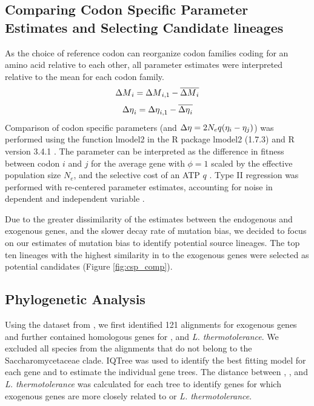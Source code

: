 \documentclass[fleqn,letterpaper]{article}
\begin{document}
\subsection*{Comparing Codon Specific Parameter Estimates and Selecting Candidate lineages}
As the choice of reference codon can reorganize codon families coding for an amino acid relative to each other, all parameter estimates were interpreted relative to the mean for each codon family.
\begin{equation}
{\Delta M}_i = {\Delta M}_{i,1} - \overline{{\Delta M}_i}
\end{equation}
\begin{equation}
{\Delta \eta}_i = {\Delta \eta}_{i,1} - \overline{{\Delta \eta}_i}
\end{equation}
Comparison of codon specific parameters (\DM and ${\Delta \eta} = 2N_eq(\eta_i-\eta_j)$) was performed using the function lmodel2 in the R package lmodel2 (1.7.3) \citep{lmodel2} and R version 3.4.1 \citep{rcore}.
The parameter \DE can be interpreted as the difference in fitness between codon $i$ and $j$ for the average gene with $\phi = 1$ scaled by the  effective population size $N_e$, and the selective cost of an ATP $q$ \citep{gilchrist2007, gilchrist2015}.
Type II regression was performed with re-centered parameter estimates, accounting for noise in dependent and independent variable \citep{SokalAndRohlf1981}.

Due to the greater dissimilarity of the \DM estimates between the endogenous and exogenous genes, and the slower decay rate of mutation bias, we decided to focus on our estimates of mutation bias to identify potential source lineages.
The top ten lineages with the highest similarity in \DM to the exogenous genes were selected as potential candidates (Figure \ref{fig:csp_comp}).

\subsection*{Phylogenetic Analysis}
Using the dataset from \citet{shen2018}, we first identified 121 alignments for exogenous genes and further contained homologous genes for \gossypii, and \textit{L. thermotolerance}.
We excluded all species from the alignments that do not belong to the Saccharomycetaceae clade. 
IQTree \citep{nguyen2015} was used to identify the best fitting model for each gene and to estimate the individual gene trees.
The distance between \kluyveri, \gossypii, and \textit{L. thermotolerance} was calculated for each tree to identify genes for which exogenous genes are more closely related to \gossypii or  \textit{L. thermotolerance}.
\end{document}
